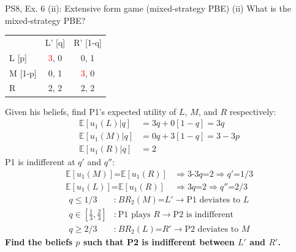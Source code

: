 \begin{frame}{PS8, Ex. 6 (ii): Extensive form game (mixed-strategy PBE)}
    (ii) What is the mixed-strategy PBE? \vspace{-8pt}
    \begin{multicols}{2}
      \begin{table}
        \begin{tabular}{l|c|c|}
          \multicolumn{1}{c}{} & \multicolumn{1}{c}{L' [q]} & \multicolumn{1}{c}{R' [1-q]} \\\cline{2-3}
          L [p]   & \textcolor{red}{3}, 0 & 0, \color{blue}1 \\\cline{2-3}
          M [1-p] & 0, \color{blue}1 & \textcolor{red}{3}, 0 \\\cline{2-3}
          R       & 2, \color{blue}2 & 2, \color{blue}2 \\\cline{2-3}
        \end{tabular}
      \end{table} \vspace{-4pt}
      Given his beliefs, find P1's expected utility of $L$, $M$, and $R$ respectively: \vspace{-4pt}
      \begin{align*}
        \mathbb{E}[u_1(L)|q]&=3q+0[1-q]=3q\\
        \mathbb{E}[u_1(M)|q]&=0q+3[1-q]=3-3p\\
        \mathbb{E}[u_1(R)|q]&=2
      \end{align*}
      P1 is indifferent at $q'$ and $q''$: \vspace{-6pt}
      \begin{align*}
        \mathbb{E}[u_1(M)]\text{=}\mathbb{E}[u_1(R)]&\Rightarrow \text{3-3}q\text{=}2\Rightarrow q'\text{=}1/3\\
        \mathbb{E}[u_1(L)]\text{=}\mathbb{E}[u_1(R)]&\Rightarrow 3q\text{=}2\Rightarrow q''\text{=}2/3
      \end{align*} \vspace{-16pt}
      \begin{align*}
        q\leq1/3&\text{:}\ BR_2(M)\text{=}L'\rightarrow\text{P1 deviates to }L\\
        q\text{$\in$}{\textstyle\left[\frac{1}{3},\frac{2}{3}\right]}&\text{:}\ \text{P1 plays }R\rightarrow\text{P2 is indifferent}\\
        q\geq2/3&\text{:}\ BR_2(L)\text{=}R'\rightarrow\text{P2 deviates to }M
      \end{align*}
      \textbf{Find the beliefs $p$ such that P2 is indifferent between $L'$ and $R'$.}

\end{multicols}
\end{frame}
